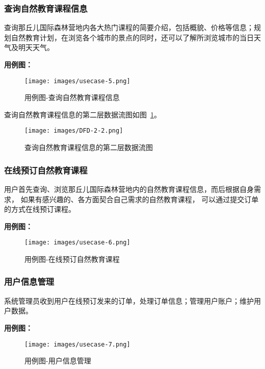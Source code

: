 \subsubsection{查询自然教育课程信息}

查询那丘儿国际森林营地内各大热门课程的简要介绍，包括概貌、价格等信息；规划自然教育计划，在浏览各个城市的景点的同时，还可以了解所浏览城市的当日天气及明天天气。

\textbf{用例图：}
\begin{figure}[H]
 \centering
 \texttt{[image: images/usecase-5.png]}
 \caption{
    用例图-查询自然教育课程信息
    }
 \vspace{-\medskipamount}
\end{figure}

查询自然教育课程信息的第二层数据流图如图~\ref{fig:DFD-2-2}。

\begin{figure}[H]
 \centering
 \texttt{[image: images/DFD-2-2.png]}
 \caption{
    查询自然教育课程信息的第二层数据流图
  }
 \label{fig:DFD-2-2}
 \vspace{-\medskipamount}
\end{figure}


\subsubsection{在线预订自然教育课程}

用户首先查询、浏览那丘儿国际森林营地内的自然教育课程信息，而后根据自身需求，
如果有感兴趣的、各方面契合自己需求的自然教育课程，
可以通过提交订单的方式在线预订课程。

\textbf{用例图：}
\begin{figure}[H]
 \centering
 \texttt{[image: images/usecase-6.png]}
 \caption{
    用例图-在线预订自然教育课程
  }
 \vspace{-\medskipamount}
\end{figure}

\subsubsection{用户信息管理}

系统管理员收到用户在线预订发来的订单，处理订单信息；管理用户账户；维护用户数据。

\textbf{用例图：}
\begin{figure}[H]
 \centering
 \texttt{[image: images/usecase-7.png]}
 \caption{
    用例图-用户信息管理
  }
 \vspace{-\medskipamount}
\end{figure}

